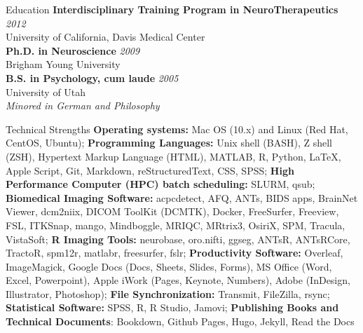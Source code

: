 \documentclass{resume} %
\begin{document}

\begin{rSection}{Education}
	{\bf Interdisciplinary Training Program in NeuroTherapeutics} \hfill {\em 2012}\\
	University of California, Davis Medical Center\\
	{\bf Ph.D. in Neuroscience} \hfill {\em 2009}\\
	Brigham Young University\\
	{\bf B.S. in Psychology, cum laude} \hfill {\em 2005}\\ 
	University of Utah\\ 
	\em{Minored in German and Philosophy}
\end{rSection}

\begin{rSection}{Technical Strengths}
	\textbf{Operating systems:} Mac OS (10.x) and Linux (Red Hat, CentOS, Ubuntu); 
	\textbf{Programming Languages:} Unix shell (BASH), Z shell (ZSH), Hypertext Markup Language (HTML), MATLAB, R, Python, LaTeX, Apple Script, Git, Markdown, reStructuredText, CSS, SPSS;
	\textbf{High Performance Computer (HPC) batch scheduling:} SLURM, qsub;
	\textbf{Biomedical Imaging Software:} acpcdetect, AFQ, ANTs, BIDS apps, BrainNet Viewer, dcm2niix, DICOM ToolKit (DCMTK), Docker, FreeSurfer, Freeview, FSL, ITKSnap, mango, Mindboggle, MRIQC, MRtrix3, OsiriX, SPM, Tracula, VistaSoft;
	\textbf{R Imaging Tools:} neurobase, oro.nifti, ggseg, ANTsR, ANTsRCore, TractoR, spm12r, matlabr, freesurfer, fslr;
	\textbf{Productivity Software:} Overleaf, ImageMagick, Google Docs (Docs, Sheets, Slides, Forms), MS Office (Word, Excel, Powerpoint), Apple iWork (Pages, Keynote, Numbers), Adobe (InDesign, Illustrator, Photoshop);
	\textbf{File Synchronization:} Transmit, FileZilla, rsync;
	\textbf{Statistical Software:} SPSS, R, R Studio, Jamovi;
	\textbf{Publishing Books and Technical Documents}: Bookdown, Github Pages, Hugo, Jekyll, Read the Docs
\end{rSection}
\end{document}
